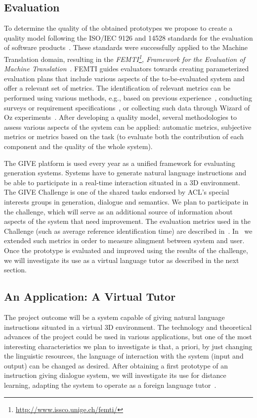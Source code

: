 \subsection{Evaluation}
To determine the quality of the obtained prototypes we propose to create a
quality model following the ISO/IEC
9126 and 14528 standards for the evaluation of software
products~\cite{ISO9126-1,ISO14598-1}. These standards were successfully applied
to
the Machine Translation domain, resulting in the
\emph{FEMTI\footnote{\url{http://www.issco.unige.ch/femti/}}, Framework for the
Evaluation of
Machine Translation}~\cite{Est2005}. FEMTI
guides evaluators towards creating parameterized evaluation
plans that include various aspects of the to-be-evaluated system and offer a
relevant set of metrics. The identification of relevant metrics can be performed
using various methods, e.g., based on previous
experience~\cite{paradise06,Litman2002}, conducting
surveys or requirement specifications~\cite{Lecoeuche98}, or
collecting such data through Wizard of Oz
experiments~\cite{Dahlback93}.
After developing a quality model, several methodologies to assess
various aspects of the system can be applied: automatic metrics,
subjective metrics or metrics based on the task (to
evaluate both the contribution of each component and the quality of the whole
system). 

The GIVE platform is used every year as a unified framework for evaluating
generation systems. Systems have to generate natural language
instructions and be able to participate in a real-time interaction situated in a
3D environment. The GIVE Challenge is one of the shared tasks endorsed by
ACL's special interests groups in generation, dialogue and semantics. We plan
to participate in the challenge, which will serve as an additional
source of information about aspects of the system that need
improvement. The evaluation metrics used in the Challenge (such as average reference
identification time) are described in~\cite{byron09}. In~\cite{amoia10} we
extended such metrics in order to measure alingment between system and user. 
Once the prototype is evaluated and improved using the results
of the challenge, we will investigate its use as a virtual language tutor as
described in the next section.

\subsection{An Application: A Virtual Tutor}\label{applications}

The project outcome will be a system capable of giving natural language
instructions situated in a virtual 3D environment. The technology and
theoretical advances of the project could be used in various applications, but
one of the most interesting characteristics we plan to investigate is that, 
a priori, by just changing the linguistic resources, the language of interaction
with the system (input and output) can be changed as desired. After obtaining a
first prototype of an instruction giving dialogue system, 
 we will investigate its use for distance learning,
adapting the system to operate as a foreign language tutor~\cite{Wik09}.

